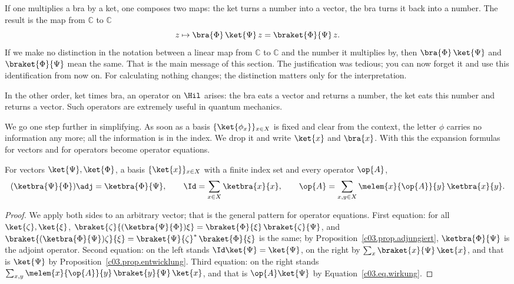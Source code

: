 If one multiplies a bra by a ket, one composes two maps: the ket turns a number into a vector,
the bra turns it back into a number. The result is the map from $\mathbb{C}$ to $\mathbb{C}$
\begin{equation*}
  z \mapsto \bra{\Phi}\, \ket{\Psi}\, z = \braket{\Phi}{\Psi}\, z .
\end{equation*}
If we make no distinction in the notation between a linear map from $\mathbb{C}$ to
$\mathbb{C}$ and the number it multiplies by, then $\bra{\Phi}\, \ket{\Psi}$ and
$\braket{\Phi}{\Psi}$ mean the same. That is the main message of this section. The
justification was tedious; you can now forget it and use this identification from now on. For
calculating nothing changes; the distinction matters only for the interpretation.

In the other order, ket times bra, an operator on $\Hil$ arises: the bra eats a vector and
returns a number, the ket eats this number and returns a vector. Such operators are extremely
useful in quantum mechanics.


We go one step further in simplifying. As soon as a basis $\{\ket{\phi_x}\}_{x \in X}$ is fixed
and clear from the context, the letter $\phi$ carries no information any more; all the
information is in the index. We drop it and write $\ket{x}$ and $\bra{x}$. With this the
expansion formulas for vectors and for operators become operator equations.

\begin{proposition}\label{c03.prop.ketbra}
  For vectors $\ket{\Psi}, \ket{\Phi}$, a basis $\{\ket{x}\}_{x \in X}$ with a finite index set
  and every operator $\op{A}$,
  \begin{equation}\label{c03.eq.ketbra}
    (\ketbra{\Psi}{\Phi})\adj = \ketbra{\Phi}{\Psi} ,
    \qquad
    \Id = \sum_{x \in X} \ketbra{x}{x} ,
    \qquad
    \op{A} = \sum_{x, y \in X} \melem{x}{\op{A}}{y}\, \ketbra{x}{y} .
  \end{equation}
\end{proposition}
\begin{proof}
  We apply both sides to an arbitrary vector; that is the general pattern for operator
  equations. First equation: for all $\ket{\zeta}, \ket{\xi}$,
  $\braket{\zeta}{(\ketbra{\Psi}{\Phi})\xi} = \braket{\Phi}{\xi}\, \braket{\zeta}{\Psi}$, and
  $\braket{(\ketbra{\Phi}{\Psi})\zeta}{\xi} = \braket{\Psi}{\zeta}^*\, \braket{\Phi}{\xi}$ is the
  same; by Proposition~\ref{c03.prop.adjungiert}, $\ketbra{\Phi}{\Psi}$ is the adjoint
  operator. Second equation: on the left stands $\Id\ket{\Psi} = \ket{\Psi}$, on the right by
   $\sum_x \braket{x}{\Psi}\, \ket{x}$, and that is $\ket{\Psi}$ by
  Proposition~\ref{c03.prop.entwicklung}. Third equation: on the right stands
  $\sum_{x,y} \melem{x}{\op{A}}{y}\, \braket{y}{\Psi}\, \ket{x}$, and that is
  $\op{A}\ket{\Psi}$ by Equation~\eqref{c03.eq.wirkung}.
\end{proof}

